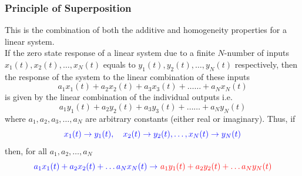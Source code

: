 \documentclass[
  12pt,
  a4paper,
]{report}
\begin{document}
\subsubsection{Principle of
Superposition}\label{principle-of-superposition}

\begin{tcolorbox}[colback=boxbodycol,colframe=boxheadcol,title=\textcolor{red}{\textbf{Principle of Superposition}}]
    This is the combination of both the additive and homogeneity properties for a linear system.\\
    If the zero state response of a linear system due to a finite \(N\text{-number}\) of inputs \(x_1(t), x_2(t), \dots, x_N(t)\) equals to \(y_1(t), y_2(t), \dots, y_N(t)\) respectively, then the response of the system to the linear combination of these inputs
    \begin{equation}
        \label{eq:linear-superposition-input-equation}
        a_1x_1(t) + a_2x_2(t) + a_3x_3(t) + \dots\dots + a_Nx_N(t)
    \end{equation}
    is given by the linear combination of the individual outputs i.e.
    \begin{equation}
        \label{eq:linear-superposition-output-equation}
        a_1y_1(t) + a_2y_2(t) + a_3y_3(t) + \dots\dots + a_Ny_N(t)
    \end{equation}
    where \(a_1, a_2, a_3, \dots, a_N\) are arbitrary constants (either real or imaginary).   
    Thus, if 
    \begin{equation}
        \label{eq:linear-superposition-equation-noconstants}
        \textcolor{blue}{x_1(t) \rightarrow y_1(t), \quad x_2(t) \rightarrow y_2(t), \dots, x_N(t) \rightarrow y_N(t)}
    \end{equation}
    then, for all \(a_1, a_2, \dots, a_N\)
    \begin{equation}
        \label{eq:linear-superposition-equation-constants}
        \textcolor{blue}{a_1x_1(t) + a_2x_2(t) + \ldots  a_Nx_N(t)\rightarrow}\ \textcolor{red}{ a_1y_1(t) + a_2y_2(t) + \ldots  a_Ny_N(t)}
    \end{equation}
    \begin{tcolorbox}[colback=boxbodycol,colframe=boxheadcol,title=\textcolor{red}{\textbf{Superposition Principle Diagram}}]
        \begin{figure}[H]
            \begin{center}
                \label{fig:superposition-principle-diagram-tikz}
                \begin{tikzpicture}[auto, thick, node distance=2cm, >=Latex]

\end{tikzpicture}
\end{center}
\end{figure}
\end{tcolorbox}
\end{tcolorbox}
\end{document}
